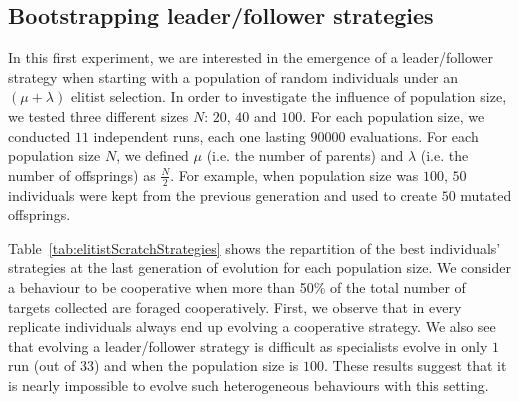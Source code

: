   \subsection{Bootstrapping leader/follower strategies}
    In this first experiment, we are interested in the emergence of a leader/follower strategy when starting with a population of random individuals under an \((\mu + \lambda)\) elitist selection. In order to investigate the influence of population size, we tested three different sizes \(N\): $20$, $40$ and $100$. For each population size, we conducted $11$ independent runs, each one lasting $90000$ evaluations. For each population size \(N\), we defined \(\mu\) (i.e. the number of parents) and \(\lambda\) (i.e. the number of offsprings) as \(\frac{N}{2}\). For example, when population size was $100$, $50$ individuals were kept from the previous generation and used to create $50$ mutated offsprings.

    \begin{table}[ht]
      \caption{\textbf{Strategies evolved by the best individuals under elitist selection with an initially random population.} Repartition of the different strategies adopted by the best individuals at the last evaluation in each of the replicates for different population sizes \(N\). We indicate in each cell the number of simulations where a particular strategy evolved. Populations were evolved under an \((\mu + \lambda)\) elitist selection, with \(\mu = \frac{N}{2}\) and \(\lambda = \frac{N}{2}\). Individuals' genotype values were intially random. In the table "L/F" stands for leader/follower and "NC" for "Non-Cooperative".}
      \label{tab:elitistScratchStrategies}
    \end{table}

    Table~\ref{tab:elitistScratchStrategies} shows the repartition of the best individuals' strategies at the last generation of evolution for each population size. We consider a behaviour to be cooperative when more than 50\% of the total number of targets collected are foraged cooperatively. First, we observe that in every replicate individuals always end up evolving a cooperative strategy. We also see that evolving a leader/follower strategy is difficult as specialists evolve in only $1$ run (out of $33$) and when the population size is $100$. These results suggest that it is nearly impossible to evolve such heterogeneous behaviours with this setting.

